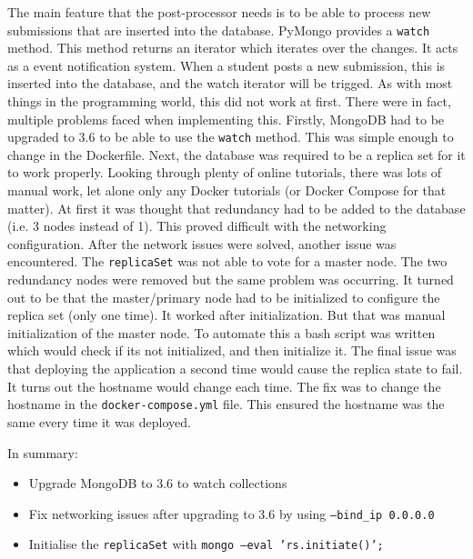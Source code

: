 The main feature that the post-processor needs is to be able to process new submissions that are inserted into the database. PyMongo provides a \texttt{watch} method. This method returns an iterator which iterates over the changes. It acts as a event notification system. When a student posts a new submission, this is inserted into the database, and the watch iterator will be trigged. As with most things in the programming world, this did not work at first. There were in fact, multiple problems faced when implementing this. Firstly, MongoDB had to be upgraded to 3.6 to be able to use the \texttt{watch} method. This was simple enough to change in the Dockerfile. Next, the database was required to be a replica set for it to work properly. Looking through plenty of online tutorials, there was lots of manual work, let alone only any Docker tutorials (or Docker Compose for that matter). At first it was thought that redundancy had to be added to the database (i.e. 3 nodes instead of 1). This proved difficult with the networking configuration. After the network issues were solved, another issue was encountered. The \texttt{replicaSet} was not able to vote for a master node. The two redundancy nodes were removed but the same problem was occurring. It turned out to be that the master/primary node had to be initialized to configure the replica set (only one time). It worked after initialization. But that was manual initialization of the master node. To automate this a bash script was written which would check if its not initialized, and then initialize it. The final issue was that deploying the application a second time would cause the replica state to fail. It turns out the hostname would change each time. The fix was to change the hostname in the \texttt{docker-compose.yml} file. This ensured the hostname was the same every time it was deployed.

In summary:

\begin{itemize}
\item Upgrade MongoDB to 3.6 to watch collections\cite{MongoDBChangeStreams}
\item Fix networking issues after upgrading to 3.6 by using \texttt{--bind\_ip 0.0.0.0}
\item Initialise the \texttt{replicaSet} with \texttt{mongo --eval 'rs.initiate()';}
\end{itemize}

